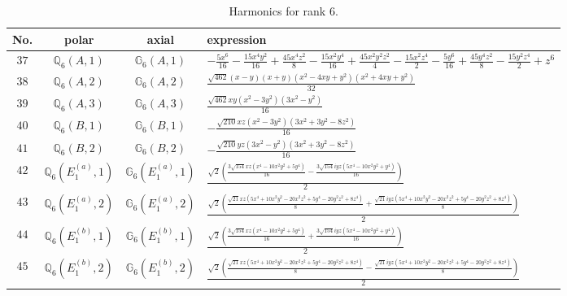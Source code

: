 \documentclass[fleqn,8pt,landscape]{jsarticle}
\begin{document}
\begin{table}[ht!]
\begin{center}
\caption{Harmonics for rank 6.}
\renewcommand{\arraystretch}{1.3}
\begin{tabular}{cccl} \hline \hline
No. & polar & axial & expression \\ \hline
$ 37 $ & $ \mathbb{Q}_{6}(A,1) $ & $ \mathbb{G}_{6}(A,1) $ & $ - \frac{5 x^{6}}{16} - \frac{15 x^{4} y^{2}}{16} + \frac{45 x^{4} z^{2}}{8} - \frac{15 x^{2} y^{4}}{16} + \frac{45 x^{2} y^{2} z^{2}}{4} - \frac{15 x^{2} z^{4}}{2} - \frac{5 y^{6}}{16} + \frac{45 y^{4} z^{2}}{8} - \frac{15 y^{2} z^{4}}{2} + z^{6} $ \\
$ 38 $ & $ \mathbb{Q}_{6}(A,2) $ & $ \mathbb{G}_{6}(A,2) $ & $ \frac{\sqrt{462} \left(x - y\right) \left(x + y\right) \left(x^{2} - 4 x y + y^{2}\right) \left(x^{2} + 4 x y + y^{2}\right)}{32} $ \\
$ 39 $ & $ \mathbb{Q}_{6}(A,3) $ & $ \mathbb{G}_{6}(A,3) $ & $ \frac{\sqrt{462} x y \left(x^{2} - 3 y^{2}\right) \left(3 x^{2} - y^{2}\right)}{16} $ \\
$ 40 $ & $ \mathbb{Q}_{6}(B,1) $ & $ \mathbb{G}_{6}(B,1) $ & $ - \frac{\sqrt{210} x z \left(x^{2} - 3 y^{2}\right) \left(3 x^{2} + 3 y^{2} - 8 z^{2}\right)}{16} $ \\
$ 41 $ & $ \mathbb{Q}_{6}(B,2) $ & $ \mathbb{G}_{6}(B,2) $ & $ - \frac{\sqrt{210} y z \left(3 x^{2} - y^{2}\right) \left(3 x^{2} + 3 y^{2} - 8 z^{2}\right)}{16} $ \\
$ 42 $ & $ \mathbb{Q}_{6}(E_{1}^{(a)},1) $ & $ \mathbb{G}_{6}(E_{1}^{(a)},1) $ & $ \frac{\sqrt{2} \left(\frac{3 \sqrt{154} x z \left(x^{4} - 10 x^{2} y^{2} + 5 y^{4}\right)}{16} - \frac{3 \sqrt{154} i y z \left(5 x^{4} - 10 x^{2} y^{2} + y^{4}\right)}{16}\right)}{2} $ \\
$ 43 $ & $ \mathbb{Q}_{6}(E_{1}^{(a)},2) $ & $ \mathbb{G}_{6}(E_{1}^{(a)},2) $ & $ \frac{\sqrt{2} \left(\frac{\sqrt{21} x z \left(5 x^{4} + 10 x^{2} y^{2} - 20 x^{2} z^{2} + 5 y^{4} - 20 y^{2} z^{2} + 8 z^{4}\right)}{8} + \frac{\sqrt{21} i y z \left(5 x^{4} + 10 x^{2} y^{2} - 20 x^{2} z^{2} + 5 y^{4} - 20 y^{2} z^{2} + 8 z^{4}\right)}{8}\right)}{2} $ \\
$ 44 $ & $ \mathbb{Q}_{6}(E_{1}^{(b)},1) $ & $ \mathbb{G}_{6}(E_{1}^{(b)},1) $ & $ \frac{\sqrt{2} \left(\frac{3 \sqrt{154} x z \left(x^{4} - 10 x^{2} y^{2} + 5 y^{4}\right)}{16} + \frac{3 \sqrt{154} i y z \left(5 x^{4} - 10 x^{2} y^{2} + y^{4}\right)}{16}\right)}{2} $ \\
$ 45 $ & $ \mathbb{Q}_{6}(E_{1}^{(b)},2) $ & $ \mathbb{G}_{6}(E_{1}^{(b)},2) $ & $ \frac{\sqrt{2} \left(\frac{\sqrt{21} x z \left(5 x^{4} + 10 x^{2} y^{2} - 20 x^{2} z^{2} + 5 y^{4} - 20 y^{2} z^{2} + 8 z^{4}\right)}{8} - \frac{\sqrt{21} i y z \left(5 x^{4} + 10 x^{2} y^{2} - 20 x^{2} z^{2} + 5 y^{4} - 20 y^{2} z^{2} + 8 z^{4}\right)}{8}\right)}{2} $ \\

\end{tabular}
\end{center}
\end{table}
\end{document}
